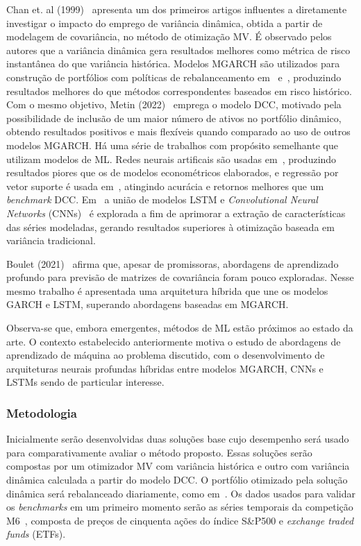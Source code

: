 \documentclass[a4paper, 12pt]{article}
\begin{document}
\begin{spacing}{.9}
Chan et. al (1999)~\cite{chan1999portfolio} apresenta um dos primeiros artigos
influentes a diretamente investigar o impacto do emprego de variância dinâmica,
obtida a partir de modelagem de covariância, no método de otimização MV. É
observado pelos autores que a variância dinâmica gera resultados melhores como
métrica de risco instantânea do que variância histórica. Modelos MGARCH são
utilizados para construção de portfólios com políticas de rebalanceamento
em~\cite{holten} e~\cite{weirum}, produzindo resultados melhores do que métodos
correspondentes baseados em risco histórico. Com o mesmo objetivo, Metin
(2022)~\cite{metin} emprega o modelo DCC, motivado pela possibilidade de
inclusão de um maior número de ativos no portfólio dinâmico, obtendo resultados
positivos e mais flexíveis quando comparado ao uso de outros modelos MGARCH. Há
uma série de trabalhos com propósito semelhante que utilizam modelos de ML.
Redes neurais artificais são usadas em~\cite{ann}, produzindo resultados piores
que os de modelos econométricos elaborados, e regressão por vetor suporte é
usada em~\cite{svr}, atingindo acurácia e retornos melhores que um
\emph{benchmark} DCC. Em~\cite{dl2} a união de modelos LSTM e
\emph{Convolutional Neural Networks} (CNNs)~\cite{cnn} é explorada a fim de
aprimorar a extração de características das séries modeladas, gerando
resultados superiores à otimização baseada em variância tradicional.

Boulet (2021)~\cite{dl_multi} afirma que, apesar de promissoras, abordagens de
aprendizado profundo para previsão de matrizes de covariância foram pouco
exploradas. Nesse mesmo trabalho é apresentada uma arquitetura híbrida que une
os modelos GARCH e LSTM, superando abordagens baseadas em MGARCH.

Observa-se que, embora emergentes, métodos de ML estão próximos ao estado da
arte. O contexto estabelecido anteriormente motiva o estudo de abordagens de
aprendizado de máquina ao problema discutido, com o desenvolvimento de
arquiteturas neurais profundas híbridas entre modelos MGARCH, CNNs e LSTMs
sendo de particular interesse.

\subsubsection*{Metodologia}

Inicialmente serão desenvolvidas duas soluções base cujo desempenho será usado
para comparativamente avaliar o método proposto. Essas soluções serão compostas
por um otimizador MV com variância histórica e outro com variância dinâmica
calculada a partir do modelo DCC. O portfólio otimizado pela solução dinâmica
será rebalanceado diariamente, como em~\cite{metin}. Os dados usados para
validar os \emph{benchmarks} em um primeiro momento serão as séries temporais
da competição M6~\cite{m6}, composta de preços de cinquenta ações do índice
S\&P500 e \emph{exchange traded funds} (ETFs).


\end{spacing}
\end{document}
